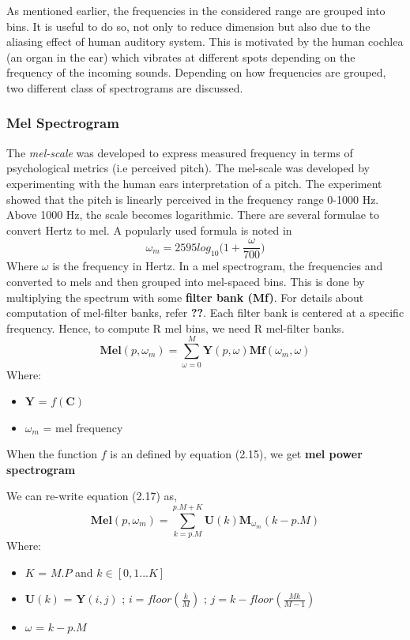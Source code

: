 \noindent As mentioned earlier, the frequencies in the considered range are  grouped into bins. It is useful to do so, not only to reduce dimension but also due to the aliasing effect of human auditory system. This is motivated by the human cochlea (an organ in the ear) which vibrates at different spots depending on the frequency of the incoming sounds. Depending on how frequencies are grouped, two different class of spectrograms are discussed.
  
\subsubsection{Mel Spectrogram}

The \textit{mel-scale} was developed to express measured frequency in terms of psychological metrics (i.e perceived pitch). The mel-scale was developed
by experimenting with the human ears interpretation of a pitch. The experiment showed that the pitch is linearly perceived in the frequency range 0-1000 Hz. Above
1000 Hz, the scale becomes logarithmic. There are several formulae to convert Hertz to mel. A popularly used formula is noted in \cite{speech}
\begin{equation}
\omega_{m} = 2595log_{10}\bigg(1+\frac{ \omega }{700}\bigg)
\end{equation}
Where $\omega$ is the frequency in Hertz. In a mel spectrogram, the frequencies and converted to mels and then grouped into mel-spaced bins. This is done by multiplying the spectrum with some \textbf{filter bank (Mf)}. For details about computation of mel-filter banks, refer \textbf{??}. Each filter bank is centered at a specific frequency. Hence, to compute R mel bins, we need R mel-filter banks. 
\begin{equation}
\textbf{Mel}(p,\omega_{m}) = \displaystyle\sum_{ \omega = 0}^{M}\textbf{Y}(p, \omega)\textbf{Mf}(\omega_{m}, \omega)
\end{equation}
Where:
\begin{itemize}[label=]
    \setlength\itemsep{0em}
    \item $\textbf{Y}$ = $f(\textbf{C})$
    \item $\omega_{m}$ = mel frequency
\end{itemize}    
When the function $f$ is an defined by equation (2.15), we get \textbf{mel power spectrogram}
\bigskip

\noindent We can re-write equation (2.17) as, 
\begin{equation}
\textbf{Mel}(p,\omega_{m}) = \displaystyle\sum_{k=p.M}^{p.M + K}\textbf{U}(k)\textbf{M}_{\omega_{m}}(k-p.M)
\end{equation}
Where:
\begin{itemize}[label=]
    \setlength\itemsep{0em}
    \item $K$ = $M.P$ and $k \in [0,1...K]$
    \item $\textbf{U}(k)$ = $\textbf{Y}(i,j)$ ; $i = floor(\frac{k}{M})$ ; $j = k-floor(\frac{Mk}{M-1})$
    \item $\omega$ = $k-p.M$
\end{itemize}

